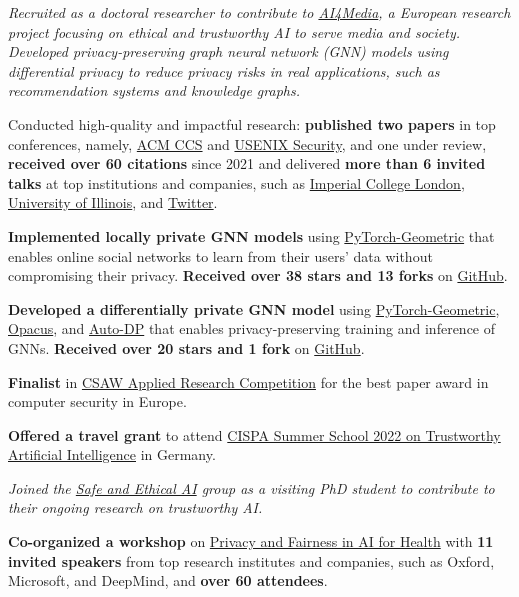 \documentclass[11pt]{article}
\begin{document}
\textit{Recruited as a doctoral researcher to contribute to \href{https://www.ai4media.eu/}{AI4Media}, a European research project focusing on ethical and trustworthy AI to serve media and society. Developed privacy-preserving graph neural network (GNN) models using differential privacy to reduce privacy risks in real applications, such as recommendation systems and knowledge graphs.}
	\begin{innerlist}
		\item Conducted high-quality and impactful research: \textbf{published two papers} in top conferences, namely, \href{https://www.sigsac.org/ccs/CCS2021/}{ACM CCS} and \href{https://www.usenix.org/conference/usenixsecurity23/}{USENIX Security}, and one under review, \textbf{received over 60 citations} since 2021 and delivered \textbf{more than 6 invited talks} at top institutions and companies, such as \href{https://ix.imperial.ac.uk/}{Imperial College London}, \href{https://cs.uic.edu/}{University of Illinois}, and \href{https://twitter.com/}{Twitter}.
		\item \textbf{Implemented locally private GNN models} using \href{https://www.pyg.org/}{PyTorch-Geometric} that enables online social networks to learn from their users' data without compromising their privacy. \textbf{Received over 38 stars and 13 forks} on \href{https://github.com/sisaman/LPGNN}{GitHub}.
		\item \textbf{Developed a differentially private GNN model} using \href{https://www.pyg.org/}{PyTorch-Geometric}, \href{https://opacus.ai/}{Opacus}, and \href{https://github.com/yuxiangw/autodp}{Auto-DP} that enables privacy-preserving training and inference of GNNs. \textbf{Received over 20 stars and 1 fork} on \href{https://github.com/sisaman/GAP}{GitHub}.
		\item \textbf{Finalist} in \href{https://www.csaw.io/research}{CSAW Applied Research Competition} for the best paper award in computer security in Europe.
		\item \textbf{Offered a travel grant} to attend \href{https://cispa.de/en/summer-school-2022}{CISPA Summer School 2022 on Trustworthy Artificial Intelligence} in Germany.
	\end{innerlist}

\textit{Joined the \href{https://www.turing.ac.uk/research/research-programmes/artificial-intelligence-ai/safe-and-ethical}{Safe and Ethical AI} group as a visiting PhD student to contribute to their ongoing research on trustworthy AI.}
  \begin{innerlist}
    \item \textbf{Co-organized a workshop} on \href{https://private-fair-ai.github.io/}{Privacy and Fairness in AI for Health} with \textbf{11 invited speakers} from top research institutes and companies, such as {Oxford}, {Microsoft}, and {DeepMind}, and \textbf{over 60 attendees}.
  \end{innerlist}
\end{document}
